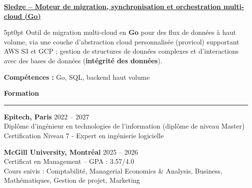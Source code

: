 \documentclass[9pt]{extarticle}
\begin{document}
\par\vspace{8pt}

\underline{\bfseries Sledge -- Moteur de migration, synchronisation et orchestration multi-cloud (Go)}
\par
\begin{adjustwidth}{5pt}{0pt}
    Outil de migration multi-cloud en {\bfseries Go} pour des flux de données à haut volume, via une couche d'abstraction cloud personnalisée ({\ttfamily provicol}) supportant AWS S3 et GCP ; gestion de structures de données complexes et d'interactions avec des bases de données ({\bfseries intégrité des données}).
\end{adjustwidth}
\par
{\bfseries Compétences :} Go, SQL, backend haut volume

\par\vspace{8pt}



{\large\bfseries Formation}
\par\vspace{-8pt}
\rule{\linewidth}{0.4pt}
\par\vspace{5pt}

{\bfseries Epitech, Paris} \hfill 2022 -- 2027 \\
Diplôme d'ingénieur en technologies de l'information (diplôme de niveau Master) \\
Certification Niveau 7 - Expert en ingénierie logicielle

\vspace{6pt}

{\bfseries McGill University, Montréal} \hfill 2025 -- 2026 \\
Certificat en Management -- GPA : 3.57/4.0 \\
Cours suivis : Comptabilité, Managerial Economics \& Analysis, Business, Mathématiques, Gestion de projet, Marketing
\end{document}
